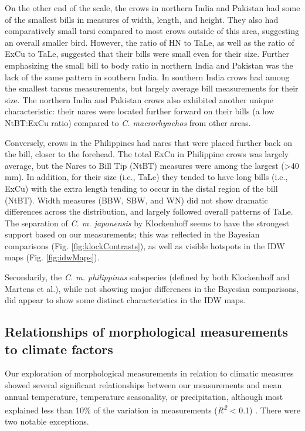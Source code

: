 \documentclass[10pt,a4paper]{article}
\begin{document}
On the other end of the scale, the crows in northern India and Pakistan had some of the smallest bills in measures of width, length, and height.
They also had comparatively small tarsi compared to most crows outside of this area, suggesting an overall smaller bird.
However, the ratio of HN to TaLe, as well as the ratio of ExCu to TaLe, suggested that their bills were small even for their size.
Further emphasizing the small bill to body ratio in northern India and Pakistan was the lack of the same pattern in southern India.
In southern India crows had among the smallest tarsus measurements, but largely average bill measurements for their size.
The northern India and Pakistan crows also exhibited another unique characteristic: their nares were located further forward on their bills (a low NtBT:ExCu ratio) compared to \emph{C. macrorhynchos} from other areas.

Conversely, crows in the Philippines had nares that were placed further back on the bill, closer to the forehead.
The total ExCu in Philippine crows was largely average, but the Nares to Bill Tip (NtBT) measures were among the largest (\textgreater40 mm).
In addition, for their size (i.e., TaLe) they tended to have long bills (i.e., ExCu) with the extra length tending to occur in the distal region of the bill (NtBT).
Width measures (BBW, SBW, and WN) did not show dramatic differences across the distribution, and largely followed overall patterns of TaLe.
The separation of \emph{C. m. japonensis} by Klockenhoff seems to have the strongest support based on our measurements; this was reflected in the Bayesian comparisons (Fig. \ref{fig:klockContrasts}), as well as visible hotspots in the IDW maps (Fig. \ref{fig:idwMaps}).

Secondarily, the \emph{C. m. philippinus} subspecies (defined by both Klockenhoff and Martens et al.), while not showing major differences in the Bayesian comparisons, did appear to show some distinct characteristics in the IDW maps.

\subsection{Relationships of morphological measurements to climate factors}\label{relationships-of-morphological-measurements-to-climate-factors}

Our exploration of morphological measurements in relation to climatic measures showed several significant relationships between our measurements and mean annual temperature, temperature seasonality, or precipitation, although most explained less than 10\% of the variation in measurements (\emph{R\textsuperscript{2}} \textless{} 0.1) .
There were two notable exceptions.
\end{document}
